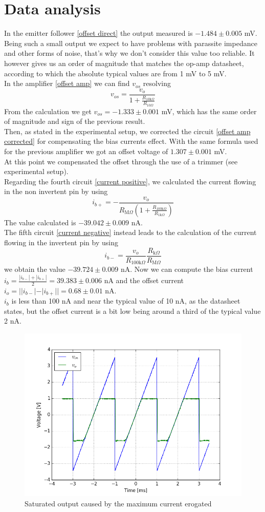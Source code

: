 \section{Data analysis}
In the emitter follower \eqref{offset direct} the output measured is $-1.484 \pm 0.005$ mV. Being such a small output we expect to have problems with parassite impedance and other forms of noise, that's why we don't consider this value too reliable. It however gives us an order of magnitude that matches the op-amp datasheet, according to which the absolute typical values are from 1 mV to 5 mV.\\
In the amplifier \eqref{offset amp} we can find $v_{os}$ resolving
\[v_{os} = \frac{v_{o}}{1 + \frac{R_{10\text{k}\Omega}}{R_{10\Omega}}}\]
From the calculation we get $v_{os} = -1.333 \pm 0.001$ mV, which has the same order of magnitude and sign of the previous result.\\
Then, as stated in the experimental setup, we corrected the circuit \eqref{offset amp corrected} for compensating the bias currents effect. With the same formula used for the previous amplifier we got an offset voltage of $1.307 \pm 0.001$ mV.\\
At this point we compensated the offset through the use of a trimmer (see experimental setup).\\
Regarding the fourth circuit \eqref{current positive}, we calculated the current flowing in the non invertent pin by using $$i_{b+} = -\frac{v_{o}}{R_{\text{M}\Omega} (1 + \frac{R_{100\text{k}\Omega}}{R_{1\text{k}\Omega}})}$$ The value calculated is $-39.042 \pm 0.009$ nA.\\
The fifth circuit \eqref{current negative} instead leads to the calculation of the current flowing in the invertent pin by using 
\[i_{b-} = \frac{v_{o}}{R_{100\text{k}\Omega}} \frac{R_{\text{k}\Omega}}{R_{\text{M}\Omega}}\]
we obtain the value $-39.724 \pm 0.009$ nA. Now we can compute the bias current $i_b = \frac{|i_{b-}| + |i_{b+}|}{2} = 39.383 \pm 0.006$ nA and the offset current $i_o = ||i_{b-}| - |i_{b+}|| = 0.68 \pm 0.01$ nA.\\
$i_b$ is less than 100 nA and near the typical value of 10 nA, as the datasheet states, but the offset current is a bit low being around a third of the typical value 2 nA.\\
\begin{figure}[H]
\centering
\includegraphics[width=.6\textwidth]{3/Maximum_current_erogated.png}
\caption{Saturated output caused by the maximum current erogated}
\end{figure}
